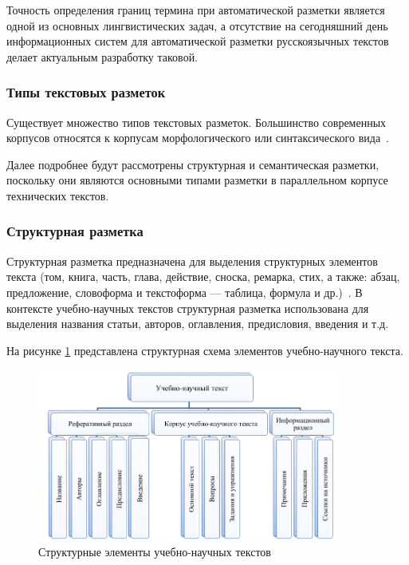 Точность определения границ термина при автоматической разметки является одной из основных лингвистических задач, а отсутствие на сегодняшний день информационных систем для автоматической разметки русскоязычных текстов делает актуальным разработку таковой.


\subsubsection*{Типы текстовых разметок}

Существует множество типов текстовых разметок.
Большинство современных корпусов относятся к корпусам морфологического или синтаксического вида~\cite{cl2020}.

Далее подробнее будут рассмотрены структурная и семантическая разметки, поскольку они являются основными типами разметки в параллельном корпусе технических текстов.

\newpage

\subsubsection*{Структурная разметка}

Структурная разметка предназначена для выделения структурных элементов текста (том, книга, часть, глава, действие, сноска, ремарка, стих, а также: абзац, предложение, словоформа и текстоформа --- таблица, формула и др.)~\cite{lesnikov2019}.
В контексте учебно-научных текстов структурная разметка использована для выделения названия статьи, авторов, оглавления, предисловия, введения и т.д.

На рисунке \ref{fig:ts} представлена структурная схема элементов учебно-научного текста. 

\begin{figure}[H]
	\centering
	\includegraphics[width=0.9\textwidth]{img/tagging-struct.png}
	\caption{Структурные элементы учебно-научных текстов~\cite{butenko2021}}
	\label{fig:ts}
\end{figure}

